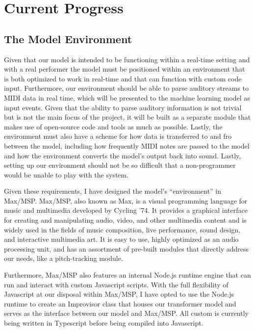 \documentclass[../main.tex]{subfiles}
\begin{document}
\thispagestyle{plain}
\newpage

\section{Current Progress}

\subsection{The Model Environment}

Given that our model is intended to be functioning within a real-time setting and with a real performer the model must be positioned within an environment that is both optimized to work in real-time and that can function with custom code input. Furthermore, our environment should be able to parse auditory streams to MIDI data in real time, which will be presented to the machine learning model as input events. Given that the ability to parse auditory information is not trivial but is not the main focus of the project, it will be built as a separate module that makes use of open-source code and tools as much as possible. Lastly, the environment must also have a scheme for how data is transferred to and fro between the model, including how frequently MIDI notes are passed to the model and how the environment converts the model's output back into sound. Lastly, setting up our environment should not be so difficult that a non-programmer would be unable to play with the system. 

Given these requirements, I have designed the model's ``environment'' in Max/MSP. Max/MSP, also known as Max, is a visual programming language for music and multimedia developed by Cycling '74. It provides a graphical interface for creating and manipulating audio, video, and other multimedia content and is widely used in the fields of music composition, live performance, sound design, and interactive multimedia art. It is easy to use, highly optimized as an audio processing unit, and has an assortment of pre-built modules that directly address our needs, like a pitch-tracking module. 

Furthermore, Max/MSP also features an internal Node.js runtime engine that can run and interact with custom Javascript scripts. With the full flexibility of Javascript at our disposal within Max/MSP, I have opted to use the Node.js runtime to create an Improvisor class that houses our transformer model and serves as the interface between our model and Max/MSP. All custom is currently being written in Typescript before being compiled into Javascript.
\end{document}
